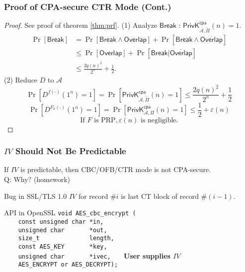\begin{frame}\frametitle{Proof of CPA-secure CTR Mode (Cont.)}
\begin{proof}
See proof of theorem \ref{thm:prf}.
(1) Analyze $\mathsf{Break}$ : $\mathsf{PrivK}_{\mathcal{A},\tilde{\Pi}}^{\mathsf{cpa}}(n)=1$.
\[
\begin{split}
	\Pr[\mathsf{Break}] & =\Pr[\mathsf{Break} \land \mathsf{Overlap}] + \Pr[\mathsf{Break} \land \overline{\mathsf{Overlap}}] \\
	&\le \Pr[\mathsf{Overlap}] + \Pr[\mathsf{Break} | \overline{\mathsf{Overlap}}] \\
	&\le \frac{2q(n)^2}{2^n} + \frac{1}{2}.
\end{split}
\]
(2) Reduce $D$ to $\mathcal{A}$
\[ \Pr[D^{f(\cdot)}(1^n)=1]=\Pr[\mathsf{PrivK}_{\mathcal{A},\tilde{\Pi}}^{\mathsf{cpa}}(n)=1] \le \frac{2q(n)^2}{2^n} + \frac{1}{2}
\]
\[\Pr[D^{F_k(\cdot)}(1^n)=1]=\Pr[\mathsf{PrivK}_{\mathcal{A},\Pi}^{\mathsf{cpa}}(n)=1] \le \frac{1}{2} + \varepsilon(n)
\]
\[ \text{If } F \text{ is PRP}, \varepsilon(n) \text{ is negligible.}
\]
\end{proof}
\end{frame}
\begin{frame}[fragile]\frametitle{$IV$ Should Not Be Predictable}
If $IV$ is predictable, then CBC/OFB/CTR mode is not CPA-secure.\\
\alert{Q: Why? (homework)}
\begin{exampleblock}{Bug in SSL/TLS 1.0}
$IV$ for record $\#i$ is last CT block of record $\#(i-1)$.
\end{exampleblock}
\begin{exampleblock}{API in OpenSSL}
\verb#void AES_cbc_encrypt (# \\
\verb#    const unsigned char *in,# \\
\verb#    unsigned char       *out,# \\
\verb#    size_t              length,# \\
\verb#    const AES_KEY       *key,# \\
\verb#    unsigned char       *ivec,   #  \alert{\textbf{User supplies $IV$}} \\
\verb#    AES_ENCRYPT or AES_DECRYPT);# \\
\end{exampleblock}
\end{frame}
